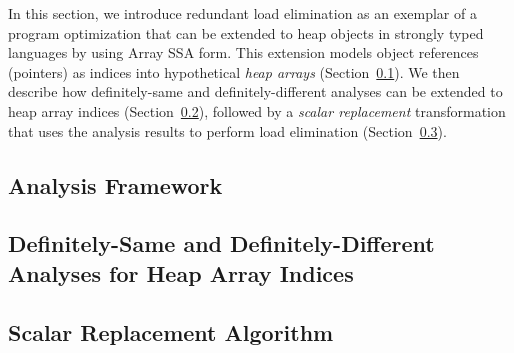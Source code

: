 In this section, we
introduce redundant load elimination as an exemplar of a program
optimization that can be extended to heap objects  in strongly typed
languages by using Array SSA form.
This extension models object references (pointers) as
indices into hypothetical {\em heap arrays} (Section~\ref{model}).
We then describe how definitely-same and definitely-different analyses
can be extended to heap array indices (Section~\ref {svalnum}),
followed by a {\em scalar replacement} transformation
that uses the analysis results to perform load elimination (Section~\ref{scalrep}).

\subsection{Analysis Framework}\label{model}

\subsection{ Definitely-Same and Definitely-Different Analyses for Heap Array Indices}\label{svalnum}

\subsection{Scalar Replacement Algorithm}
\label{scalrep}


